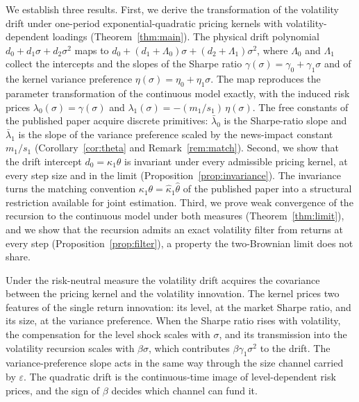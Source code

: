 \documentclass[11pt]{article}
\theoremstyle{remark}
\begin{document}
We establish three results.
First, we derive the transformation of the volatility drift under
one-period exponential-quadratic pricing kernels with volatility-dependent
loadings (Theorem~\ref{thm:main}).
The physical drift polynomial $d_0+d_1\sigma+d_2\sigma^2$ maps to
$d_0+(d_1+\Lambda_0)\sigma+(d_2+\Lambda_1)\sigma^2$, where $\Lambda_0$ and
$\Lambda_1$ collect the intercepts and the slopes of the Sharpe ratio
$\gamma(\sigma)=\gamma_0+\gamma_1\sigma$ and of the kernel variance
preference $\eta(\sigma)=\eta_0+\eta_1\sigma$.
The map reproduces the parameter transformation of the continuous model
exactly, with the induced risk prices $\lambda_0(\sigma)=\gamma(\sigma)$
and $\lambda_1(\sigma)=-(m_1/s_1)\,\eta(\sigma)$.
The free constants of the published paper acquire discrete primitives:
$\bar\lambda_0$ is the Sharpe-ratio slope and $\bar\lambda_1$ is the slope
of the variance preference scaled by the news-impact constant $m_1/s_1$
(Corollary~\ref{cor:theta} and Remark~\ref{rem:match}).
Second, we show that the drift intercept $d_0=\kappa_1\theta$ is invariant
under every admissible pricing kernel, at every step size and in the limit
(Proposition~\ref{prop:invariance}).
The invariance turns the matching convention
$\kappa_1\theta=\hat\kappa_1\hat\theta$ of the published paper into a
structural restriction available for joint estimation.
Third, we prove weak convergence of the recursion to the continuous model
under both measures (Theorem~\ref{thm:limit}), and we show that the
recursion admits an exact volatility filter from returns at every step
(Proposition~\ref{prop:filter}), a property the two-Brownian limit does not
share.

Under the risk-neutral measure the volatility drift acquires the covariance
between the pricing kernel and the volatility innovation.
The kernel prices two features of the single return innovation: its level,
at the market Sharpe ratio, and its size, at the variance preference.
When the Sharpe ratio rises with volatility, the compensation for the level
shock scales with $\sigma$, and its transmission into the volatility
recursion scales with $\beta\sigma$, which contributes
$\beta\gamma_1\sigma^2$ to the drift.
The variance-preference slope acts in the same way through the size channel
carried by $\varepsilon$.
The quadratic drift is the continuous-time image of level-dependent risk
prices, and the sign of $\beta$ decides which channel can fund it.
\end{document}
